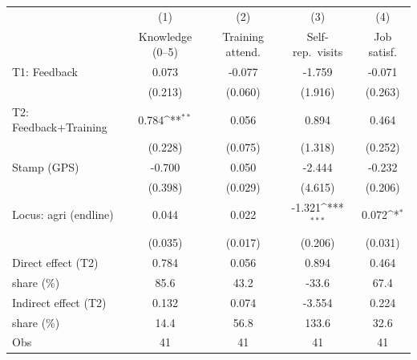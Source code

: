 {
\def\sym#1{\ifmmode^{#1}\else\(^{#1}\)\fi}
\begin{tabular}{l*{4}{c}}
\toprule
                    &\multicolumn{1}{c}{(1)}&\multicolumn{1}{c}{(2)}&\multicolumn{1}{c}{(3)}&\multicolumn{1}{c}{(4)}\\
                    &\multicolumn{1}{c}{Knowledge (0--5)}&\multicolumn{1}{c}{Training attend.}&\multicolumn{1}{c}{Self-rep.\ visits}&\multicolumn{1}{c}{Job satisf.}\\
\midrule
T1: Feedback        &       0.073         &      -0.077         &      -1.759         &      -0.071         \\
                    &     (0.213)         &     (0.060)         &     (1.916)         &     (0.263)         \\
T2: Feedback+Training&       0.784\sym{**} &       0.056         &       0.894         &       0.464         \\
                    &     (0.228)         &     (0.075)         &     (1.318)         &     (0.252)         \\
Stamp (GPS)         &      -0.700         &       0.050         &      -2.444         &      -0.232         \\
                    &     (0.398)         &     (0.029)         &     (4.615)         &     (0.206)         \\
Locus: agri (endline)&       0.044         &       0.022         &      -1.321\sym{***}&       0.072\sym{*}  \\
                    &     (0.035)         &     (0.017)         &     (0.206)         &     (0.031)         \\
\midrule
Direct effect (T2)  &       0.784         &       0.056         &       0.894         &       0.464         \\
\quad share (\%)    &        85.6         &        43.2         &       -33.6         &        67.4         \\
Indirect effect (T2)&       0.132         &       0.074         &      -3.554         &       0.224         \\
\quad share (\%)    &        14.4         &        56.8         &       133.6         &        32.6         \\
Obs                 &          41         &          41         &          41         &          41         \\
\bottomrule
\end{tabular}
}
